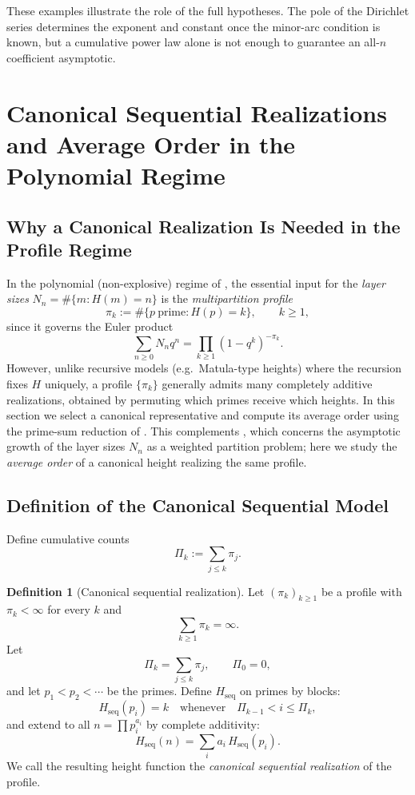 \documentclass[11pt]{article}
\theoremstyle{definition}
\newtheorem{definition}{Definition}
\newcommand{\height}{H}
\begin{document}
These examples illustrate the role of the full hypotheses.  The pole of the
Dirichlet series determines the exponent and constant once the minor-arc
condition is known, but a cumulative power law alone is not enough to guarantee
an all-$n$ coefficient asymptotic.

\section{Canonical Sequential Realizations and Average Order in the Polynomial Regime}\label{sec7}

\subsection{Why a Canonical Realization Is Needed in the Profile Regime}
In the polynomial (non-explosive) regime of , the essential input for the \emph{layer sizes}
$N_n=\#\{m:\height(m)=n\}$ is the \emph{multipartition profile}
\[
\pi_k := \#\{p \ \text{prime} : \height(p)=k\},\qquad k\ge 1,
\]
since it governs the Euler product
\[
\sum_{n\ge 0}N_n q^n=\prod_{k\ge 1}(1-q^k)^{-\pi_k}.
\]
However, unlike recursive models (e.g.\ Matula-type heights) where the recursion fixes $\height$ uniquely,
a profile $\{\pi_k\}$ generally admits many completely additive realizations, obtained by permuting
which primes receive which heights.  In this section we select a canonical representative and
compute its average order using the prime-sum reduction of .
This complements , which concerns the asymptotic growth of the layer sizes $N_n$ as a
weighted partition problem; here we study the \emph{average order} of a canonical height realizing the
same profile.

\subsection{Definition of the Canonical Sequential Model}
Define cumulative counts
\[
\Pi_k := \sum_{j\le k}\pi_j.
\]

\begin{definition}[Canonical sequential realization]\label{def:Hseq}
Let $(\pi_k)_{k\ge1}$ be a profile with $\pi_k<\infty$ for every $k$ and
\[
  \sum_{k\ge1}\pi_k=\infty.
\]
Let
\[
  \Pi_k=\sum_{j\le k}\pi_j,\qquad \Pi_0=0,
\]
and let $p_1<p_2<\cdots$ be the primes.  Define
$\height_{\mathrm{seq}}$ on primes by blocks:
\[
\height_{\mathrm{seq}}(p_i)=k
\quad\text{whenever}\quad
\Pi_{k-1}< i\le \Pi_k,
\]
and extend to all $n=\prod p_i^{a_i}$ by complete additivity:
\[
\height_{\mathrm{seq}}(n)=\sum_i a_i\,\height_{\mathrm{seq}}(p_i).
\]
We call the resulting height function the \emph{canonical sequential realization}
of the profile.
\end{definition}
\end{document}
